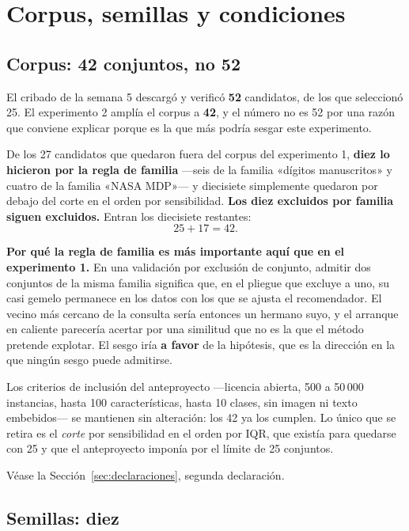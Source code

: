 \documentclass[11pt,letterpaper]{article}
\begin{document}
\section{Corpus, semillas y condiciones}
\label{sec:corpus}

\subsection{Corpus: 42 conjuntos, no 52}

El cribado de la semana 5 descargó y verificó \textbf{52} candidatos, de los que
seleccionó 25. El experimento 2 amplía el corpus a \textbf{42}, y el número no es 52
por una razón que conviene explicar porque es la que más podría sesgar este
experimento.

De los 27 candidatos que quedaron fuera del corpus del experimento 1, \textbf{diez lo
hicieron por la regla de familia} ---seis de la familia «dígitos manuscritos» y
cuatro de la familia «NASA MDP»--- y diecisiete simplemente quedaron por debajo del
corte en el orden por sensibilidad. \textbf{Los diez excluidos por familia siguen
excluidos.} Entran los diecisiete restantes:
\[
  25 + 17 = 42 .
\]

\textbf{Por qué la regla de familia es más importante aquí que en el experimento 1.}
En una validación por exclusión de conjunto, admitir dos conjuntos de la misma
familia significa que, en el pliegue que excluye a uno, su casi gemelo permanece en
los datos con los que se ajusta el recomendador. El vecino más cercano de la consulta
sería entonces un hermano suyo, y el arranque en caliente parecería acertar por una
similitud que no es la que el método pretende explotar. El sesgo iría
\textbf{a favor} de la hipótesis, que es la dirección en la que ningún sesgo puede
admitirse.

Los criterios de inclusión del anteproyecto ---licencia abierta, 500 a 50\,000
instancias, hasta 100 características, hasta 10 clases, sin imagen ni texto
embebidos--- se mantienen sin alteración: los 42 ya los cumplen. Lo único que se
retira es el \emph{corte} por sensibilidad en el orden por IQR, que existía para
quedarse con 25 y que el anteproyecto imponía por el límite de 25 conjuntos.

Véase la Sección~\ref{sec:declaraciones}, segunda declaración.

\subsection{Semillas: diez}
\end{document}
